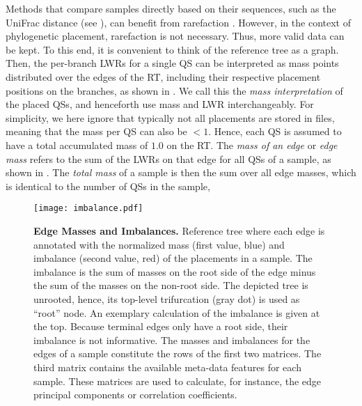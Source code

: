 Methods that compare samples directly based on their sequences,
such as the UniFrac distance \cite{Lozupone2005,Lozupone2007a}
(see ),
can benefit from rarefaction \cite{Weiss2017}.
However, in the context of phylogenetic placement, rarefaction is not necessary.
Thus, more valid data can be kept.
To this end, it is convenient to think of the reference tree as a graph.
Then, the per-branch \acp{LWR} for a single \ac{QS}
can be interpreted as mass points distributed over the edges of the \ac{RT},
including their respective placement positions on the branches, as shown in .
We call this the \emph{mass interpretation} of the placed \acp{QS},
and henceforth use mass and \ac{LWR} interchangeably.
For simplicity, we here ignore that typically not all placements are stored in  files,
meaning that the mass per QS can also be $<1$.
Hence, each \ac{QS} is assumed to have a total accumulated mass of $1.0$ on the \ac{RT}.
The \emph{mass of an edge} or \emph{edge mass} refers to the sum of the \acp{LWR} on that edge for all \acp{QS} of a sample,
as shown in .
The \emph{total mass} of a sample is then the sum over all edge masses,
which is identical to the number of \acp{QS} in the sample,

\begin{figure}[!ht]
    \centering
    \texttt{[image: imbalance.pdf]}
    \begin{subfigure}{0pt}
        \label{fig:imbalance:sub:ReferenceTree}
    \end{subfigure}
    \begin{subfigure}{0pt}
        \label{fig:imbalance:sub:Matrices}
    \end{subfigure}
    \caption[Edge Masses and Imbalances]{
        \textbf{Edge Masses and Imbalances.}
        Reference tree where each edge is annotated with the normalized mass (first value, blue) and
        imbalance (second value, red) of the placements in a sample.
        The imbalance is the sum of masses on the root side of the edge minus the sum of the masses on the non-root side.
        The depicted tree is unrooted, hence, its top-level trifurcation (gray dot) is used as ``root'' node.
        An exemplary calculation of the imbalance is given at the top.
        Because terminal edges only have a root side, their imbalance is not informative.
        The masses and imbalances for the edges of a sample constitute the rows of the first two matrices.
        The third matrix contains the available meta-data features for each sample.
        These matrices are used to calculate, for instance, the edge principal components or correlation coefficients.
    }
    \label{fig:imbalance}
\end{figure}

